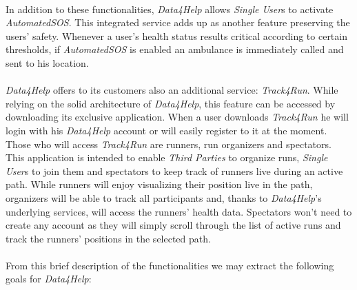 \documentclass[titlepage]{article}
\begin{document}
\\
In addition to these functionalities, {\it Data4Help} allows {\it Single User}s to activate {\it AutomatedSOS}. This integrated service adds up as another feature preserving the users’ safety. Whenever a user’s health status results critical according to certain thresholds, if {\it AutomatedSOS} is enabled an ambulance is immediately called and sent to his location.\\
\\
{\it Data4Help} offers to its customers also an additional service: {\it Track4Run}. While relying on the solid architecture of {\it Data4Help}, this feature can be accessed by downloading its exclusive application. When a user downloads {\it Track4Run} he will login with his {\it Data4Help} account or will easily register to it at the moment. Those who will access {\it Track4Run} are runners, run organizers and spectators. This application is intended to enable {\it Third Parties} to organize runs, {\it Single User}s to join them and spectators to keep track of runners live during an active path. While runners will enjoy visualizing their position live in the path, organizers will be able to track all participants and, thanks to {\it Data4Help}’s underlying services, will access the runners’ health data. Spectators won’t need to create any account as they will simply scroll through the list of active runs and track the runners’ positions in the selected path.\\
\\
From this brief description of the functionalities we may extract the following goals for {\it Data4Help}: \\
		
\end{document}
